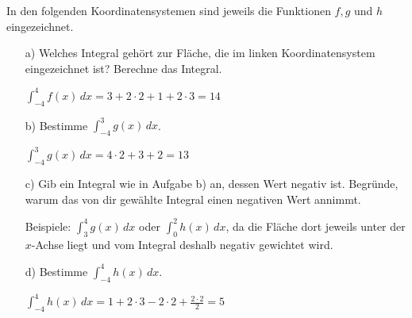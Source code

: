 \documentclass[]{uebungsblatt}
\begin{document}
\begin{exercise}
    In den folgenden Koordinatensystemen sind jeweils die Funktionen $f,g$ und $h$ eingezeichnet.
    \begin{enumerate}
        \item[a)] Welches Integral gehört zur Fläche, die im linken Koordinatensystem eingezeichnet ist? Berechne das Integral.
            \begin{answerbox}[0.55in]
                $\displaystyle \int_{-4}^4f(x)\,dx=3+2\cdot 2+1+2\cdot 3=14$
            \end{answerbox}
        \item[b)] Bestimme $\displaystyle \int_{-4}^3g(x)\,dx$.
            \begin{answerbox}[0.55in]
                $\displaystyle \int_{-4}^3g(x)\,dx=4\cdot 2+3+2=13$
            \end{answerbox}
        \item[c)] Gib ein Integral wie in Aufgabe b) an, dessen Wert negativ ist. Begründe, warum das von dir gewählte 
        Integral einen negativen Wert annimmt.
            \begin{answerbox}[0.75in]
                Beispiele: $\displaystyle \int_{3}^4g(x)\,dx$ oder $\displaystyle \int_{0}^2h(x)\,dx$, da die Fläche 
                dort jeweils unter der $x$-Achse liegt und vom Integral deshalb negativ gewichtet wird.
            \end{answerbox}
        \item[d)] Bestimme $\displaystyle \int_{-4}^4h(x)\,dx$.
            \begin{answerbox}[0.55in]
                $\displaystyle \int_{-4}^4h(x)\,dx=1+2\cdot 3-2\cdot 2+\frac{2\cdot 2}{2}=5$
            \end{answerbox}
    \end{enumerate}
    \begin{multicols}{3}


\end{multicols}
\end{exercise}
\end{document}
